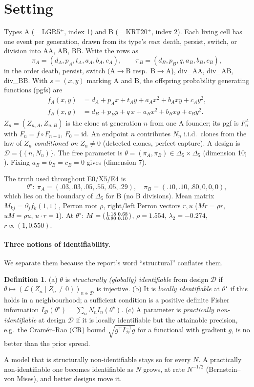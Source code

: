 \documentclass[11pt]{article}
\theoremstyle{definition}
\newtheorem{definition}[theorem]{Definition}
\theoremstyle{remark}
\newcommand{\code}[1]{\texttt{\detokenize{#1}}}
\begin{document}
\section{Setting}\label{sec:setting}
Types A (= LGR5$^+$, index 1) and B (= KRT20$^+$, index 2). Each living cell has one event per generation, drawn from its type's \emph{row}: death, persist, switch, or division into AA, AB, BB. Write the rows as
\[
\pi_A=(d_A,p_A,t_A,a_A,b_A,c_A),\qquad \pi_B=(d_B,p_B,q,a_B,b_B,c_B),
\]
in the order death, persist, switch (A$\to$B resp.\ B$\to$A), div\_AA, div\_AB, div\_BB. With $s=(x,y)$ marking A and B, the offspring probability generating functions (pgfs) are
\begin{align*}
f_A(x,y)&=d_A+p_Ax+t_Ay+a_Ax^2+b_Axy+c_Ay^2,\\
f_B(x,y)&=d_B+p_By+q\,x+a_Bx^2+b_Bxy+c_By^2 .
\end{align*}
$Z_n=(Z_{n,A},Z_{n,B})$ is the clone at generation $n$ from one A founder; its pgf is $F^A_n$ with $F_n=f\circ F_{n-1}$, $F_0=\mathrm{id}$. An endpoint $n$ contributes $N_n$ i.i.d.\ clones from the law of $Z_n$ \emph{conditioned on $Z_n\neq 0$} (detected clones, perfect capture). A design is $\mathcal D=\{(n,N_n)\}$. The free parameter is $\theta=(\pi_A,\pi_B)\in\Delta_5\times\Delta_5$ (dimension 10; \code{two_type}). Fixing $a_B=b_B=c_B=0$ gives \code{reversible_ab} (dimension 7).

The truth used throughout E0/X5/E4 is
\[
\theta^\star:\ \pi_A=(.03,.03,.05,.55,.05,.29),\quad \pi_B=(.10,.10,.80,0,0,0),
\]
which lies on the boundary of $\Delta_5$ for B (no B divisions). Mean matrix $M_{kj}=\partial_j f_k(1,1)$, Perron root $\rho$, right/left Perron vectors $r,u$ ($Mr=\rho r$, $uM=\rho u$, $u\cdot r=1$). At $\theta^\star$: $M=\begin{psmallmatrix}1.18&0.68\\0.80&0.10\end{psmallmatrix}$, $\rho=1.554$, $\lambda_2=-0.274$, $r\propto(1,0.550)$.

\paragraph{Three notions of identifiability.} We separate them because the report's word ``structural'' conflates them.
\begin{definition}
(a) $\theta$ is \emph{structurally (globally) identifiable} from design $\mathcal D$ if $\theta\mapsto (\mathcal L(Z_n\mid Z_n\neq0))_{n\in\mathcal D}$ is injective. (b) It is \emph{locally identifiable} at $\theta^\star$ if this holds in a neighbourhood; a sufficient condition is a positive definite Fisher information $I_{\mathcal D}(\theta^\star)=\sum_n N_n I_n(\theta^\star)$. (c) A parameter is \emph{practically non-identifiable} at design $\mathcal D$ if it is locally identifiable but the attainable precision, e.g.\ the Cram\'er--Rao (CR) bound $\sqrt{g^\top I_{\mathcal D}^{-1}g}$ for a functional with gradient $g$, is no better than the prior spread.
\end{definition}
A model that is structurally non-identifiable stays so for every $N$. A practically non-identifiable one becomes identifiable as $N$ grows, at rate $N^{-1/2}$ (Bernstein--von Mises), and better designs move it.
\end{document}
